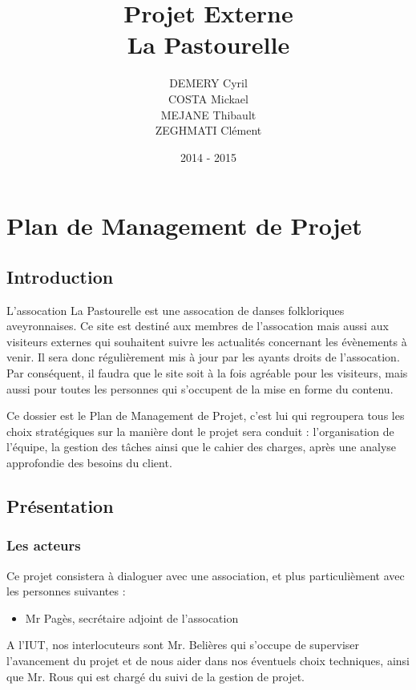 \documentclass[11pt]{report}
\title{Projet Externe\\La Pastourelle}
\author{DEMERY Cyril\\COSTA Mickael\\MEJANE Thibault\\ZEGHMATI Clément}
\date{2014 - 2015}
\begin{document}
\maketitle
\setcounter{tocdepth}{5}
\tableofcontents
\chapter{Plan de Management de Projet}
\section{Introduction}
L'assocation La Pastourelle est une assocation de danses folkloriques 
aveyronnaises. Ce site est destiné aux membres de l'assocation mais aussi aux 
visiteurs externes qui souhaitent suivre les actualités concernant les 
évènements à venir. Il sera donc régulièrement mis à jour par les ayants 
droits de l'assocation. Par conséquent, il faudra que le site soit à la fois 
agréable pour les visiteurs, mais aussi pour toutes les personnes qui 
s'occupent de la mise en forme du contenu.\\

\par Ce dossier est le Plan de Management de Projet, c'est lui qui regroupera 
tous les choix stratégiques sur la manière dont le projet sera conduit : 
l'organisation de l'équipe, la gestion des tâches ainsi que le cahier des 
charges, après une analyse approfondie des besoins du client.

\section{Présentation}
\subsection{Les acteurs}
Ce projet consistera à dialoguer avec une association, et plus particulièment 
avec les personnes suivantes : 
\begin{itemize}
    \item Mr Pagès, secrétaire adjoint de l'assocation\\
\end{itemize}

\par A l'IUT, nos interlocuteurs sont Mr. Belières qui s'occupe de superviser 
l'avancement du projet et de nous aider dans nos éventuels choix techniques, 
ainsi que Mr. Rous qui est chargé du suivi de la gestion de projet.   \\
\end{document}
